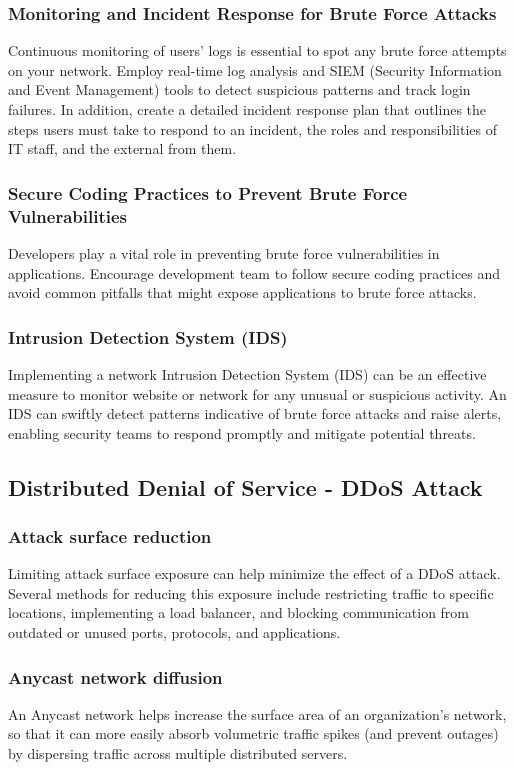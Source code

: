\documentclass{ijitcs}
\begin{document}
\subsubsection{Monitoring and Incident Response for Brute Force Attacks}
Continuous monitoring of users' logs is essential to spot any brute force attempts on your network. Employ real-time log analysis and SIEM (Security Information and Event Management) tools to detect suspicious patterns and track login failures. In addition, create a detailed incident response plan that outlines the steps users must take to respond to an incident, the roles and responsibilities of IT staff, and the external from them.
\subsubsection{Secure Coding Practices to Prevent Brute Force Vulnerabilities}
Developers play a vital role in preventing brute force vulnerabilities in applications. Encourage development team to follow secure coding practices and avoid common pitfalls that might expose applications to brute force attacks.
\subsubsection{Intrusion Detection System (IDS)}
Implementing a network Intrusion Detection System (IDS) can be an effective measure to monitor website or network for any unusual or suspicious activity. An IDS can swiftly detect patterns indicative of brute force attacks and raise alerts, enabling security teams to respond promptly and mitigate potential threats.
\subsection{Distributed Denial of Service - DDoS Attack}
\subsubsection{Attack surface reduction}
Limiting attack surface exposure can help minimize the effect of a DDoS attack. Several methods for reducing this exposure include restricting traffic to specific locations, implementing a load balancer, and blocking communication from outdated or unused ports, protocols, and applications.
\subsubsection{Anycast network diffusion}
An Anycast network helps increase the surface area of an organization’s network, so that it can more easily absorb volumetric traffic spikes (and prevent outages) by dispersing traffic across multiple distributed servers.
\end{document}
